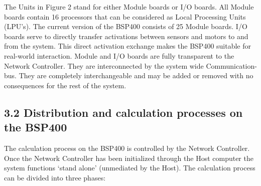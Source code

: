 \documentclass[11pt, a4paper]{article}
\begin{document}
The Units in Figure 2 stand for either Module boards or I/O boards. All Module boards contain 16 processors that can be considered as Local Processing Units (LPU's). The current version of the BSP400 consists of 25 Module boards. I/O boards serve to directly transfer activations between sensors and motors to and from the system. This direct activation exchange makes the BSP400 suitable for real-world interaction. Module and I/O boards are fully transparent to the Network Controller. They are interconnected by the system wide Communication-bus. They are completely interchangeable and may be added or removed with no consequences for the rest of the system.

\subsection*{\color{navyaccent} 3.2 Distribution and calculation processes on the BSP400}

The calculation process on the BSP400 is controlled by the Network Controller. Once the Network Controller has been initialized through the Host computer the system functions `stand alone' (unmediated by the Host). The calculation process can be divided into three phases:
\end{document}
